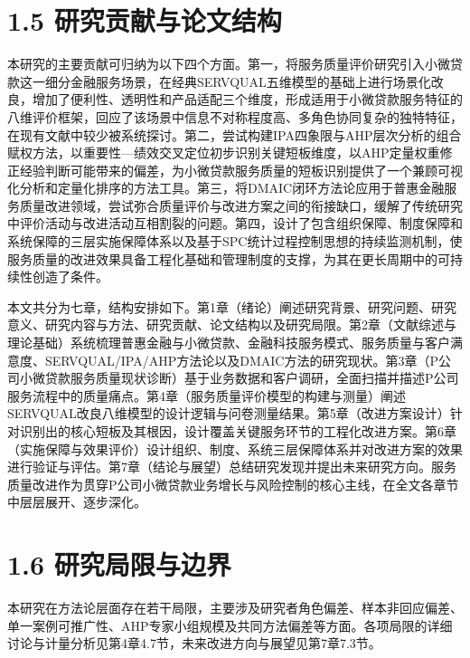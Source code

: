 \section{1.5 研究贡献与论文结构}

本研究的主要贡献可归纳为以下四个方面。第一，将服务质量评价研究引入小微贷款这一细分金融服务场景，在经典SERVQUAL五维模型的基础上进行场景化改良，增加了便利性、透明性和产品适配三个维度，形成适用于小微贷款服务特征的八维评价框架，回应了该场景中信息不对称程度高、多角色协同复杂的独特特征，在现有文献中较少被系统探讨。第二，尝试构建IPA四象限与AHP层次分析的组合赋权方法，以重要性—绩效交叉定位初步识别关键短板维度，以AHP定量权重修正经验判断可能带来的偏差，为小微贷款服务质量的短板识别提供了一个兼顾可视化分析和定量化排序的方法工具。第三，将DMAIC闭环方法论应用于普惠金融服务质量改进领域，尝试弥合质量评价与改进方案之间的衔接缺口，缓解了传统研究中评价活动与改进活动互相割裂的问题\cite{ref12}。第四，设计了包含组织保障、制度保障和系统保障的三层实施保障体系以及基于SPC统计过程控制思想的持续监测机制，使服务质量的改进效果具备工程化基础和管理制度的支撑，为其在更长周期中的可持续性创造了条件。\par

本文共分为七章，结构安排如下。第1章（绪论）阐述研究背景、研究问题、研究意义、研究内容与方法、研究贡献、论文结构以及研究局限。第2章（文献综述与理论基础）系统梳理普惠金融与小微贷款、金融科技服务模式、服务质量与客户满意度、SERVQUAL/IPA/AHP方法论以及DMAIC方法的研究现状。第3章（P公司小微贷款服务质量现状诊断）基于业务数据和客户调研，全面扫描并描述P公司服务流程中的质量痛点。第4章（服务质量评价模型的构建与测量）阐述SERVQUAL改良八维模型的设计逻辑与问卷测量结果。第5章（改进方案设计）针对识别出的核心短板及其根因，设计覆盖关键服务环节的工程化改进方案。第6章（实施保障与效果评价）设计组织、制度、系统三层保障体系并对改进方案的效果进行验证与评估。第7章（结论与展望）总结研究发现并提出未来研究方向。服务质量改进作为贯穿P公司小微贷款业务增长与风险控制的核心主线，在全文各章节中层层展开、逐步深化。\par

\section{1.6 研究局限与边界}
本研究在方法论层面存在若干局限，主要涉及研究者角色偏差、样本非回应偏差、单一案例可推广性、AHP专家小组规模及共同方法偏差等方面。各项局限的详细讨论与计量分析见第4章4.7节，未来改进方向与展望见第7章7.3节。
